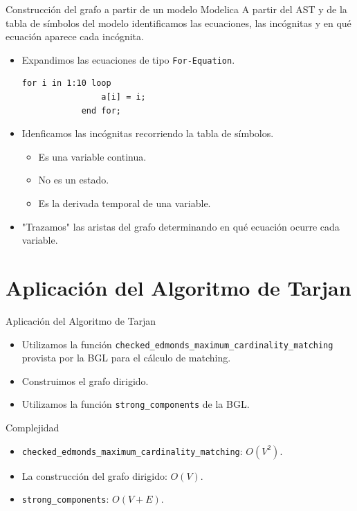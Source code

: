 \begin{frame}[fragile]{Construcción del grafo a partir de un modelo Modelica}
    A partir del AST y de la tabla de símbolos  del modelo identificamos las ecuaciones, las incógnitas y en qué ecuación aparece cada incógnita.
    \pause
    \begin{itemize}
        \item<2-> Expandimos las ecuaciones de tipo \verb+For-Equation+.
        \begin{lstlisting}[language=Modelica]
            for i in 1:10 loop
                a[i] = i;
            end for;
        \end{lstlisting}
        \item<3-> Idenficamos las incógnitas recorriendo la tabla de símbolos.
        \begin{itemize}
            \item Es una variable continua.
            \item No es un estado.
            \item Es la derivada temporal de una variable.
        \end{itemize}
        \item<4-> "Trazamos" las aristas del grafo determinando en qué ecuación ocurre cada variable.
    \end{itemize}
\end{frame}

\section{Aplicación del Algoritmo de Tarjan}

\begin{frame}[fragile]{Aplicación del Algoritmo de Tarjan}
    \begin{itemize}
        \item<1-> Utilizamos la función \verb+checked_edmonds_maximum_cardinality_matching+ provista por la BGL para el cálculo de matching.
        \item<2-> Construimos el grafo dirigido.
        \item<3-> Utilizamos la función \verb+strong_components+ de la BGL.
    \end{itemize}
\end{frame}

\begin{frame}[fragile]{Complejidad}
    \begin{itemize}
    \item \verb+checked_edmonds_maximum_cardinality_matching+: $O(V^{2})$.
    \item La construcción del grafo dirigido: $O(V)$.
    \item \verb+strong_components+: $O(V+E)$.
    \end{itemize}
\end{frame}

